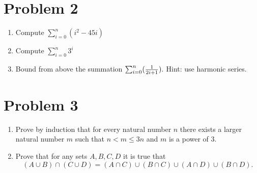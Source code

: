 \documentclass[letterpaper, 11pt]{article}
\begin{document}
\section{Problem 2}

\begin{enumerate}

\item Compute $\sum_{i=0}^n (i^2 - 45i)$

\item Compute $\sum_{i=0}^n 3^i$

\item Bound from above the summation $\sum_{i=0}^n ({1\over 2i+1}).$ Hint: use harmonic series.


\end{enumerate}

\section{Problem 3}



\begin{enumerate}

\item Prove by induction that for every natural number $n$ there exists a larger natural number $m$ 
such that $n < m \le 3n$ and $m$ is a power of $3$.


\item Prove that for any sets $A,B,C,D$ it is true that $$(A \cup B) \cap (C\cup D) = (A\cap C) \cup (B\cap C) \cup (A\cap D) \cup (B\cap D).$$


\end{enumerate}
\end{document}
